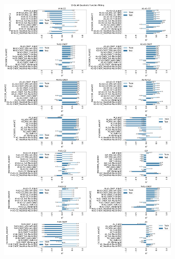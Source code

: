 \documentclass[journal=jacsat,manuscript=article]{achemso}
\begin{document}
\begin{figure}[H]
\begin{subfigure}[b]{\textwidth}
		\includegraphics[width=\textwidth]{images/Function_Fitting/16qubit_Quadratic_funcfit_R2.png}
		\caption{}
		\label{fig:16qubit_Quadratic_funcfit_R2}
	\end{subfigure}
	\hfill
	\begin{subfigure}[b]{\textwidth}
		\centering

\end{subfigure}
\end{figure}
\end{document}
